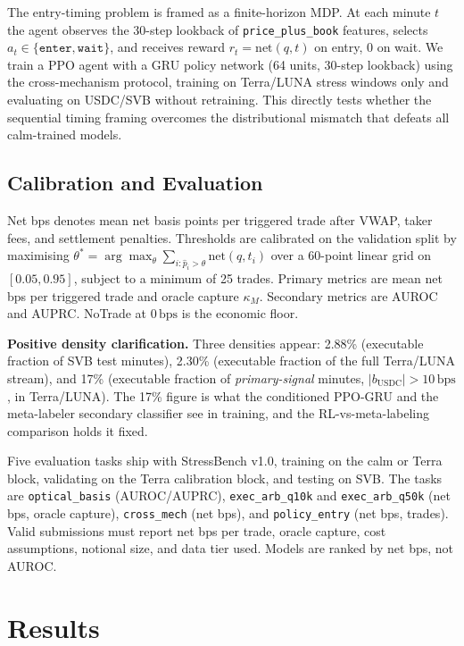 \documentclass[sigconf,anonymous,natbib=false]{acmart}
\newcommand{\bps}{\,\text{bps}}
\newcommand{\task}[1]{\texttt{\small #1}}
\begin{document}
The entry-timing problem is framed as a finite-horizon MDP.
At each minute $t$ the agent observes the 30-step lookback of
\texttt{price\_plus\_book} features, selects
$a_t \in \{\texttt{enter},\texttt{wait}\}$, and receives reward
$r_t = \text{net}(q,t)$ on entry, 0 on wait.
We train a PPO agent with a GRU policy network (64 units, 30-step
lookback) using the cross-mechanism protocol, training on Terra/LUNA
stress windows only and evaluating on USDC/SVB without retraining.
This directly tests whether the sequential timing framing overcomes
the distributional mismatch that defeats all calm-trained models.

\subsection{Calibration and Evaluation}
\label{sec:eval}

Net bps denotes mean net basis points per triggered trade after VWAP,
taker fees, and settlement penalties.
Thresholds are calibrated on the validation split by maximising
$\theta^* = \arg\max_\theta \sum_{i:\hat{p}_i>\theta} \text{net}(q,t_i)$
over a 60-point linear grid on $[0.05, 0.95]$, subject to a minimum of 25 trades.
Primary metrics are mean net bps per triggered trade and oracle
capture $\kappa_M$.
Secondary metrics are AUROC and AUPRC.
NoTrade at $0\bps$ is the economic floor.

\textbf{Positive density clarification.}
Three densities appear: 2.88\% (executable fraction of SVB test minutes), 2.30\%
(executable fraction of the full Terra/LUNA stream), and 17\% (executable fraction
of \emph{primary-signal} minutes, $|b_{\text{USDC}}|>10\bps$, in Terra/LUNA). The
17\% figure is what the conditioned PPO-GRU and the meta-labeler secondary classifier
see in training, and the RL-vs-meta-labeling comparison holds it fixed.

Five evaluation tasks ship with StressBench v1.0, training on the calm or
Terra block, validating on the Terra calibration block, and testing on SVB.
The tasks are \task{optical\_basis} (AUROC/AUPRC),
\task{exec\_arb\_q10k} and \task{exec\_arb\_q50k} (net bps, oracle capture),
\task{cross\_mech} (net bps),
and \task{policy\_entry} (net bps, trades).
Valid submissions must report net bps per trade, oracle capture,
cost assumptions, notional size, and data tier used.
Models are ranked by net bps, not AUROC.


\section{Results}
\label{sec:results}
\end{document}

